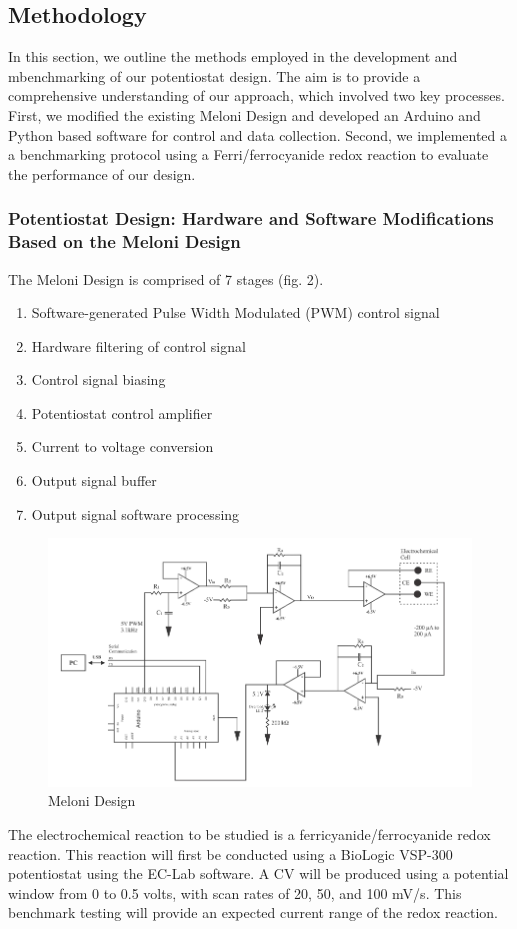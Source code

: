 \documentclass{article}
\begin{document}
\subsection*{Methodology}

In this section, we outline the methods employed in the development and mbenchmarking of our potentiostat design. The aim is to provide a comprehensive understanding of our approach, which involved two key processes. First, we modified the existing Meloni Design and developed an Arduino and Python based software for control and data collection. Second, we implemented a a benchmarking protocol using a Ferri/ferrocyanide redox reaction to evaluate the performance of our design. 

\subsubsection*{Potentiostat Design: Hardware and Software Modifications Based on the Meloni Design}

The Meloni Design is comprised of 7 stages (fig. 2).
\begin{enumerate}
    \item Software-generated Pulse Width Modulated (PWM) control signal
    \item Hardware filtering of control signal
    \item Control signal biasing
    \item Potentiostat control amplifier
    \item Current to voltage conversion
    \item Output signal buffer
    \item Output signal software processing
\end{enumerate}

\begin{figure}[H]
    \centering
    \includegraphics[width=.5\linewidth]{meloni_design.png}
    \caption{Meloni Design}
\end{figure}

The electrochemical reaction to be studied is a ferricyanide/ferrocyanide redox reaction. This reaction will first be conducted using a BioLogic VSP-300 potentiostat using the EC-Lab software. A CV will be produced using a potential window from 0 to 0.5 volts, with scan rates of 20, 50, and 100 mV/s. This benchmark testing will provide an expected current range of the redox reaction. 
\end{document}
